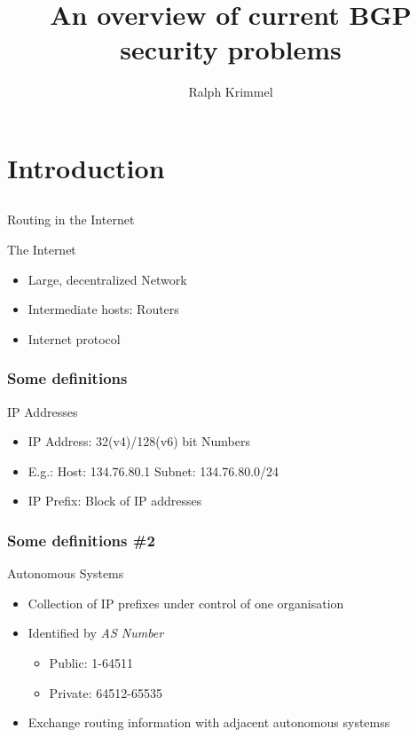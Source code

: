 \documentclass[notes=hide,yellow]{beamer}
\title{An overview of current BGP security problems}
\subtitle{ }
\author{Ralph Krimmel}
\begin{document}
	\begin{frame}
		\titlepage
	\end{frame}

	\begin{frame}
		\tableofcontents
	\end{frame}

\section{ Introduction}
\subsection*{}

\begin{frame}{Routing in the Internet}
	\begin{block}{The Internet}
	\begin{itemize}
		\item Large, decentralized Network %
		\item Intermediate hosts: Routers
		\item Internet protocol
	\end{itemize}
\end{block}
\end{frame}


\begin{frame}
	\frametitle{Some definitions}
	\begin{block}{IP Addresses}
	\begin{itemize}
		\item IP Address: 32(v4)/128(v6) bit Numbers
		\item E.g.: Host: 134.76.80.1  Subnet: 134.76.80.0/24
		\item IP Prefix: Block of IP addresses
	\end{itemize}
	\end{block}
	
\end{frame}

\begin{frame}
	\frametitle{Some definitions \#2}
	\begin{block}{Autonomous Systems}
	\begin{itemize}
		\item Collection of IP prefixes under control of one organisation
		\item Identified by \emph{AS Number}
			\begin{itemize}
				\item Public: 1-64511
				\item Private: 64512-65535 
			\end{itemize}
		\item Exchange routing information with adjacent autonomous systemss%
	\end{itemize}
	\end{block}
	
\end{frame}
\end{document}
